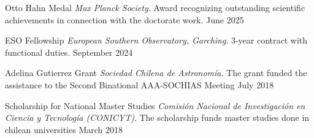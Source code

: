 \vspace{10pt}

\begin{cvhonors}
    \cvhonor
	{Otto Hahn Medal} %
	{\textit{Max Planck Society}. Award recognizing outstanding scientific achievements in connection with the doctorate work.} %
	{} %
	{June 2025}

	\cvhonor
	{ESO Fellowship} %
	{\textit{European Southern Observatory, Garching}. 3-year contract with functional duties.} %
	{} %
	{September 2024}
    
	\cvhonor
	{Adelina Gutierrez Grant} %
	{\textit{Sociedad Chilena de Astronom\'ia}. The grant funded the assistance to the Second Binational AAA-SOCHIAS Meeting} %
	{} %
	{July 2018} %
	
	\cvhonor
	{Scholarship for National Master Studies} %
	{\textit{Comisi\'on Nacional de Investigaci\'on en Ciencia y Tecnolog\'ia (CONICYT)}. The scholarship funds master studies done in chilean universities} %
	{} %
	{March 2018} %
	
\end{cvhonors}